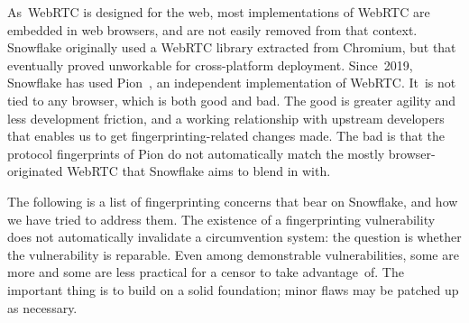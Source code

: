 \documentclass[letterpaper,twocolumn]{article}
\begin{document}
As~WebRTC is designed for the web,
most implementations of WebRTC are embedded in web browsers,
and are not easily removed from that context.
Snowflake originally used a WebRTC library extracted from Chromium,
but that eventually proved unworkable for cross-platform deployment.
Since~2019, Snowflake has used Pion~\cite{pion-webrtc},
an independent implementation of WebRTC.
It~is not tied to any browser,
which is both good and bad.
The good is greater agility and less development friction,
and a working relationship with upstream developers
that enables us to get fingerprinting-related changes made.
The bad is that the protocol fingerprints of Pion
do not automatically match the mostly browser-originated
WebRTC that Snowflake aims to blend in with.

The following is a list of fingerprinting concerns
that bear on Snowflake, and
how we have tried to address them.
The existence of a fingerprinting vulnerability
does not automatically invalidate a circumvention system:
the question is whether the vulnerability is reparable.
Even among demonstrable vulnerabilities,
some are more and some are less practical for a censor to take advantage~of.
The important thing is to build on a solid foundation;
minor flaws may be patched up as necessary.
\end{document}
